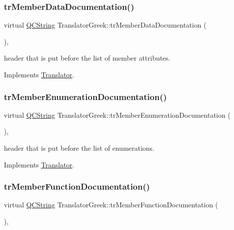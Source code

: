 \subsubsection{\texorpdfstring{trMemberDataDocumentation()}{trMemberDataDocumentation()}}
{\footnotesize\ttfamily virtual \mbox{\hyperlink{class_q_c_string}{Q\+C\+String}} Translator\+Greek\+::tr\+Member\+Data\+Documentation (\begin{DoxyParamCaption}{ }\end{DoxyParamCaption})\hspace{0.3cm}{\ttfamily [inline]}, {\ttfamily [virtual]}}

header that is put before the list of member attributes. 

Implements \mbox{\hyperlink{class_translator}{Translator}}.

\mbox{\label{class_translator_greek_ad0d81f90ab38c616d625c2e3bfc6120d}} 
\subsubsection{\texorpdfstring{trMemberEnumerationDocumentation()}{trMemberEnumerationDocumentation()}}
{\footnotesize\ttfamily virtual \mbox{\hyperlink{class_q_c_string}{Q\+C\+String}} Translator\+Greek\+::tr\+Member\+Enumeration\+Documentation (\begin{DoxyParamCaption}{ }\end{DoxyParamCaption})\hspace{0.3cm}{\ttfamily [inline]}, {\ttfamily [virtual]}}

header that is put before the list of enumerations. 

Implements \mbox{\hyperlink{class_translator}{Translator}}.

\mbox{\label{class_translator_greek_ada0eb85b90676e184d395511a8ebe262}} 
\subsubsection{\texorpdfstring{trMemberFunctionDocumentation()}{trMemberFunctionDocumentation()}}
{\footnotesize\ttfamily virtual \mbox{\hyperlink{class_q_c_string}{Q\+C\+String}} Translator\+Greek\+::tr\+Member\+Function\+Documentation (\begin{DoxyParamCaption}{ }\end{DoxyParamCaption})\hspace{0.3cm}{\ttfamily [inline]}, {\ttfamily [virtual]}}

